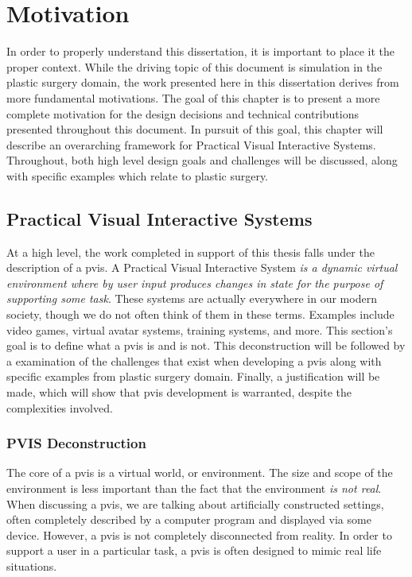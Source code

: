 
\chapter{Motivation}
\label{chp:motivation}

In order to properly understand this dissertation, it is important to
place it the proper context. While the driving topic of this document
is simulation in the plastic surgery domain, the work presented here
in this dissertation derives from more fundamental motivations. The
goal of this chapter is to present a more complete motivation for the
design decisions and technical contributions presented throughout this
document.  In pursuit of this goal, this chapter will describe an
overarching framework for Practical Visual Interactive
Systems. Throughout, both high level design goals and challenges will
be discussed, along with specific examples which relate to plastic surgery.


\section{Practical Visual Interactive Systems}


At a high level, the work completed in support of this thesis falls under the description
of a \Gls{pvis}. A Practical Visual Interactive System \textit{is a dynamic
virtual environment where by user input produces changes in state for
the purpose of supporting some task}. These systems are actually
everywhere in our modern society, though we do not often think
of them in these terms. Examples include video games, virtual avatar
systems, training systems, and more. This section's goal is to define
what a \gls{pvis} is and is not. This deconstruction will be followed
by a examination of the challenges that exist when developing a
\gls{pvis} along with specific examples from plastic surgery
domain. Finally, a justification will be made, which will show that
\gls{pvis} development is warranted, despite the complexities involved.

\subsection{PVIS Deconstruction}

The core of a \gls{pvis} is a virtual world, or environment. The size
and scope of the environment is less important than the fact that the
environment \textit{is not real}. When discussing a \gls{pvis}, we are
talking about artificially constructed settings, often completely
described by a computer program and displayed via some
device. However, a \gls{pvis} is not completely disconnected from
reality. In order to support a user in a particular task, a \gls{pvis}
is often designed to mimic real life situations.

